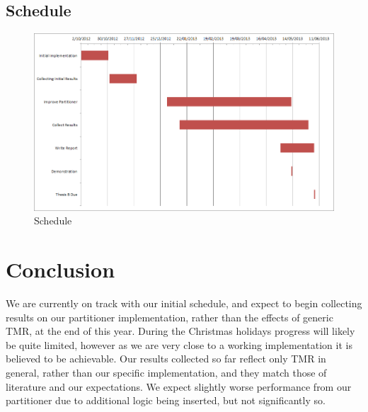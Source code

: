 \documentclass[12pt,final,oneside]{memoir} %
\begin{document}
\section{Schedule}
\begin{figure}
    \begin{center}
        \includegraphics[width=\textwidth]{images/schedule.png}
        \caption{Schedule}
        \label{AreaVElements}
    \end{center}
\end{figure}

\chapter{Conclusion}
We are currently on track with our initial schedule, and expect to begin collecting results on our partitioner implementation, rather than the effects of generic \ac{TMR}, at the end of this year. During the Christmas holidays progress will likely be quite limited, however as we are very close to a working implementation it is believed to be achievable.
Our results collected so far reflect only \ac{TMR} in general, rather than our specific implementation, and they match those of literature and our expectations. We expect slightly worse performance from our partitioner due to additional logic being inserted, but not significantly so.

\appendix
\end{document}
